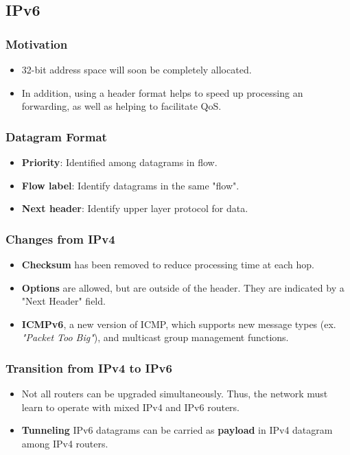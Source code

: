 \documentclass{article}
\begin{document}
\subsection{IPv6}

\subsubsection{Motivation}
\begin{itemize}
\item 32-bit address space will soon be completely allocated.
\item In addition, using a header format helps to speed up processing an forwarding, as well as helping to facilitate QoS.
\end{itemize}

\subsubsection{Datagram Format}
\begin{itemize}
\item {\bf Priority}: Identified among datagrams in flow.
\item {\bf Flow label}: Identify datagrams in the same "flow".
\item {\bf Next header}: Identify upper layer protocol for data.
\end{itemize}

\subsubsection{Changes from IPv4}
\begin{itemize}
\item {\bf Checksum} has been removed to reduce processing time at each hop.
\item {\bf Options} are allowed, but are outside of the header. They are indicated by a "Next Header" field.
\item {\bf ICMPv6}, a new version of ICMP, which supports new message types (ex. \emph{"Packet Too Big"}), and multicast group management functions.
\end{itemize}

\subsubsection{Transition from IPv4 to IPv6}
\begin{itemize}
\item Not all routers can be upgraded simultaneously. Thus, the network must learn to operate with mixed IPv4 and IPv6 routers.
\item {\bf Tunneling} IPv6 datagrams can be carried as {\bf payload} in IPv4 datagram among IPv4 routers.
\end{itemize}
\end{document}
